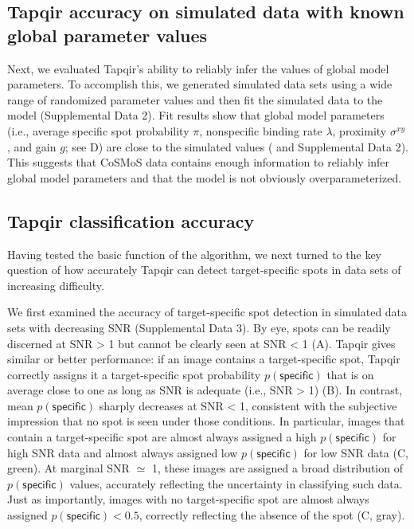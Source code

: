 

\subsection{Tapqir accuracy on simulated data with known global parameter values}

Next, we evaluated Tapqir's ability to reliably infer the values of global model parameters. To  accomplish this, we generated simulated data sets using a wide range of randomized parameter values and then fit the simulated data to the model (Supplemental Data 2). Fit results show that global model parameters (i.e., average specific spot probability $\pi$, nonspecific binding rate $\lambda$, proximity $\sigma^{xy}$, and gain $g$; see D) are close to the simulated values ( and Supplemental Data 2). This suggests that CoSMoS data contains enough information to reliably infer global model parameters and that the model is not obviously overparameterized. 

\subsection{Tapqir classification accuracy}

Having tested the basic function of the algorithm, we next turned to the key question of how accurately Tapqir can detect target-specific spots in data sets of increasing difficulty.

We first examined the accuracy of target-specific spot detection in simulated data sets with decreasing SNR (Supplemental Data 3). By eye, spots can be readily discerned at SNR > 1 but cannot be clearly seen at SNR < 1 (A). Tapqir gives similar or better performance:  if an image contains a target-specific spot, Tapqir correctly assigns it a target-specific spot probability $p(\mathsf{specific})$ that is on average close to one as long as SNR is adequate (i.e., SNR > 1) (B).  In contrast, mean $p(\mathsf{specific})$ sharply decreases at SNR < 1, consistent with the subjective impression that no spot is seen under those conditions.  In particular, images that contain a target-specific spot are almost always assigned a high $p(\mathsf{specific})$ for high SNR data and almost always assigned low $p(\mathsf{specific})$ for low SNR data (C, green).  At marginal SNR $\simeq$ 1, these images are assigned a broad distribution of $p(\mathsf{specific})$ values, accurately reflecting the uncertainty in classifying such data.  Just as importantly, images with no target-specific spot are almost always assigned $p(\mathsf{specific}) < 0.5$, correctly reflecting the absence of the spot (C, gray).

